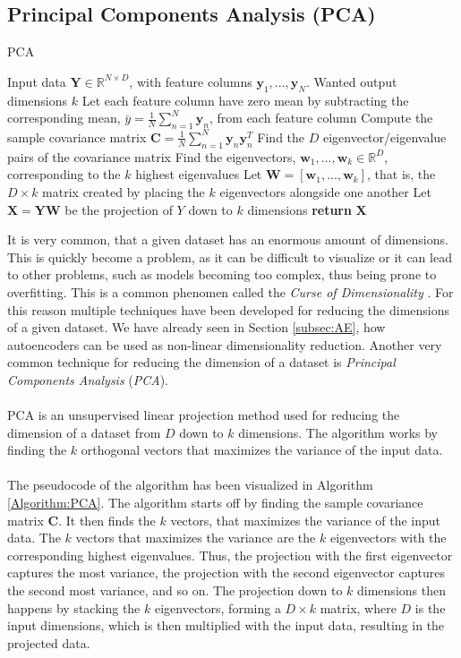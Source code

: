 \documentclass[./main.tex]{subfiles}
\begin{document}
\subsection{Principal Components Analysis (PCA)}\label{subsec:PCA}
\begin{algorithm}[htbp]
    \caption{PCA \cite{MAD_book}}
    \begin{algorithmic}[1]
        \Require Input data $\bm{Y} \in \mathbb{R}^{N \times D}$, with feature columns $\bm{y}_1, ..., \bm{y}_N$.
        \Require Wanted output dimensions $k$
        \State Let each feature column have zero mean by subtracting the corresponding mean, $\bar{y} = \frac{1}{N} \sum_{n = 1} ^N \bm{y}_n$, from each feature column
        \State Compute the sample covariance matrix $\bm{C} = \frac{1}{N} \sum_{n = 1} ^N \bm{y}_n \bm{y}_n ^T$ 
        \State Find the $D$ eigenvector/eigenvalue pairs of the covariance matrix
        \State Find the eigenvectors, $\bm{w}_1, ..., \bm{w}_k \in \mathbb{R}^D$, corresponding to the $k$ highest eigenvalues
        \State Let $\bm{W} = \left[ \bm{w}_1, ..., \bm{w}_k \right]$, that is, the $D \times k$ matrix created by placing the $k$ eigenvectors alongside one another
        \State Let $\bm{X} = \bm{Y} \bm{W}$ be the projection of $Y$ down to $k$ dimensions
        \State \textbf{return} $\bm{X}$
    \end{algorithmic}
    \label{Algorithm:PCA}
\end{algorithm}
\noindent It is very common, that a given dataset has an enormous amount of dimensions. This is quickly become a problem, as it can be difficult to visualize or it can lead to other problems, such as models becoming too complex, thus being prone to overfitting. This is a common phenomen called the \textit{Curse of Dimensionality} \cite{ESL}. For this reason multiple techniques have been developed for reducing the dimensions of a given dataset. We have already seen in Section \ref{subsec:AE}, how autoencoders can be used as non-linear dimensionality reduction. Another very common technique for reducing the dimension of a dataset is \textit{Principal Components Analysis} (\textit{PCA}).
\\
\\
PCA is an unsupervised linear projection method used for reducing the dimension of a dataset from $D$ down to $k$ dimensions. The algorithm works by finding the $k$ orthogonal vectors that maximizes the variance of the input data. \cite{MAD_book} 
\\
\\
The pseudocode of the algorithm has been visualized in Algorithm \ref{Algorithm:PCA}. The algorithm starts off by finding the sample covariance matrix $\bm{C}$. It then finds the $k$ vectors, that maximizes the variance of the input data. The $k$ vectors that maximizes the variance are the $k$ eigenvectors with the corresponding highest eigenvalues. Thus, the projection with the first eigenvector captures the most variance, the projection with the second eigenvector captures the second most variance, and so on. The projection down to $k$ dimensions then happens by stacking the $k$ eigenvectors, forming a $D \times k$ matrix, where $D$ is the input dimensions, which is then multiplied with the input data, resulting in the projected data. \cite{MAD_book}
\end{document}
